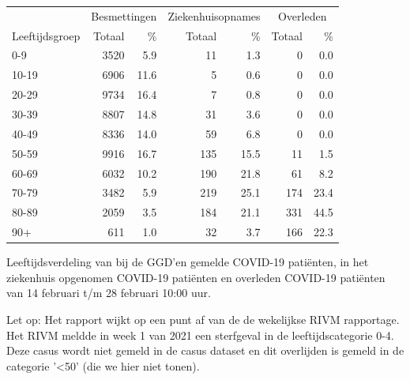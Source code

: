 \documentclass[
  english,
  man,floatsintext]{apa6}
\begin{document}
\begin{table}
\centering\begingroup\fontsize{11}{13}\selectfont

\begin{threeparttable}
\begin{tabular}{lrrrrrr}
\toprule
\multicolumn{1}{c}{ } & \multicolumn{2}{c}{Besmettingen} & \multicolumn{2}{c}{Ziekenhuisopnames} & \multicolumn{2}{c}{Overleden} \\
\cmidrule(l{3pt}r{3pt}){2-3} \cmidrule(l{3pt}r{3pt}){4-5} \cmidrule(l{3pt}r{3pt}){6-7}
Leeftijdsgroep & Totaal & \% & Totaal & \% & Totaal & \%\\
\midrule
0-9 & 3520 & 5.9 & 11 & 1.3 & 0 & 0.0\\
10-19 & 6906 & 11.6 & 5 & 0.6 & 0 & 0.0\\
20-29 & 9734 & 16.4 & 7 & 0.8 & 0 & 0.0\\
30-39 & 8807 & 14.8 & 31 & 3.6 & 0 & 0.0\\
40-49 & 8336 & 14.0 & 59 & 6.8 & 0 & 0.0\\
50-59 & 9916 & 16.7 & 135 & 15.5 & 11 & 1.5\\
60-69 & 6032 & 10.2 & 190 & 21.8 & 61 & 8.2\\
70-79 & 3482 & 5.9 & 219 & 25.1 & 174 & 23.4\\
80-89 & 2059 & 3.5 & 184 & 21.1 & 331 & 44.5\\
90+ & 611 & 1.0 & 32 & 3.7 & 166 & 22.3\\
\bottomrule
\end{tabular}
\begin{tablenotes}
\item[1] Leeftijdsverdeling van bij de GGD’en gemelde COVID-19 patiënten, in het ziekenhuis opgenomen COVID-19 patiënten en overleden COVID-19 patiënten van 14 februari t/m 28 februari 10:00 uur.
\item[2] Let op: Het rapport wijkt op een punt af van de de wekelijkse RIVM rapportage. Het RIVM meldde in week 1 van 2021 een sterfgeval in de leeftijdscategorie 0-4. Deze casus wordt niet gemeld in de casus dataset en dit overlijden is gemeld in de categorie '<50' (die we hier niet tonen).
\end{tablenotes}
\end{threeparttable}
\endgroup{}
\end{table}

\newpage
\end{document}
